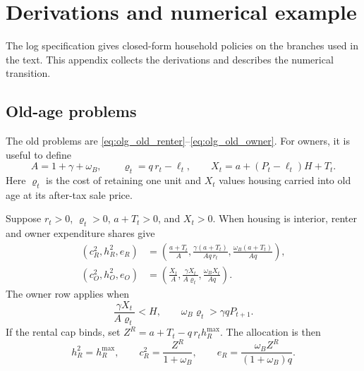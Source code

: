 
\section{Derivations and numerical example}
\label{app:olg_proofs}

The log specification gives closed-form household policies on the branches
used in the text.  This appendix collects the derivations and describes the
numerical transition.

\subsection{Old-age problems}
\label{app:olg_old_households}

The old problems are \eqref{eq:olg_old_renter}--\eqref{eq:olg_old_owner}.
For owners, it is useful to define
\begin{equation}
 A=1+\gamma+\omega_B,\qquad
 \varrho_t=q\,r_t-\ell_t,\qquad
 X_t=a+(P_t-\ell_t)H+T_t.
 \label{eq:olg_app_old_objects}
\end{equation}
Here $\varrho_t$ is the cost of retaining one unit and $X_t$ values housing
carried into old age at its after-tax sale price.

\begin{lemma}
\label{lem:olg_old_allocations}
Suppose $r_t>0$, $\varrho_t>0$, $a+T_t>0$, and $X_t>0$.
When housing is interior, renter and owner expenditure shares give
\begin{align}
 (c_R^2,h_R^2,e_R)
 &=\left(\frac{a+T_t}{A},
 \frac{\gamma(a+T_t)}{Aq\,r_t},
 \frac{\omega_B(a+T_t)}{Aq}\right),
 \label{eq:olg_app_old_renter_interior}\\
 (c_O^2,h_O^2,e_O)
 &=\left(\frac{X_t}{A},
 \frac{\gamma X_t}{A\varrho_t},
 \frac{\omega_BX_t}{Aq}\right).
 \label{eq:olg_app_old_owner_interior}
\end{align}
The owner row applies when
\begin{equation}
 \frac{\gamma X_t}{A\varrho_t}<H,\qquad
 \omega_B\varrho_t>\gamma qP_{t+1}.
 \label{eq:olg_app_old_slackness}
\end{equation}
If the rental cap binds, set
$Z^R=a+T_t-q\,r_th_R^{\max}$.  The allocation is then
\begin{equation}
 h_R^2=h_R^{\max},\qquad
 c_R^2=\frac{Z^R}{1+\omega_B},\qquad
 e_R=\frac{\omega_BZ^R}{(1+\omega_B)q}.
 \label{eq:olg_app_old_renter_cap}
\end{equation}
\end{lemma}

